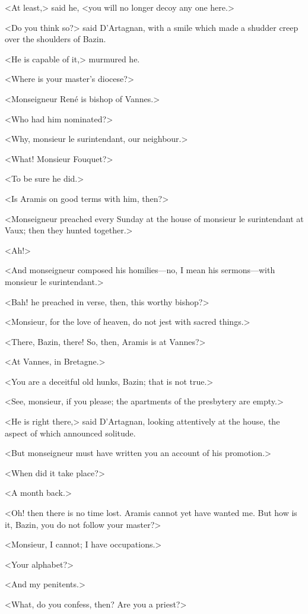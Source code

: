 <At least,> said he, <you will no longer decoy any one here.>

<Do you think so?> said D'Artagnan, with a smile which made a shudder creep over the shoulders of Bazin.

<He is capable of it,> murmured he.

<Where is your master's diocese?>

<Monseigneur René is bishop of Vannes.>

<Who had him nominated?>

<Why, monsieur le surintendant, our neighbour.>

<What! Monsieur Fouquet?>

<To be sure he did.>

<Is Aramis on good terms with him, then?>

<Monseigneur preached every Sunday at the house of monsieur le surintendant at Vaux; then they hunted together.>

<Ah!>

<And monseigneur composed his homilies—no, I mean his sermons—with monsieur le surintendant.>

<Bah! he preached in verse, then, this worthy bishop?>

<Monsieur, for the love of heaven, do not jest with sacred things.>

<There, Bazin, there! So, then, Aramis is at Vannes?>

<At Vannes, in Bretagne.>

<You are a deceitful old hunks, Bazin; that is not true.>

<See, monsieur, if you please; the apartments of the presbytery are empty.>

<He is right there,> said D'Artagnan, looking attentively at the house, the aspect of which announced solitude.

<But monseigneur must have written you an account of his promotion.>

<When did it take place?>

<A month back.>

<Oh! then there is no time lost. Aramis cannot yet have wanted me. But how is it, Bazin, you do not follow your master?>

<Monsieur, I cannot; I have occupations.>

<Your alphabet?>

<And my penitents.>

<What, do you confess, then? Are you a priest?>

